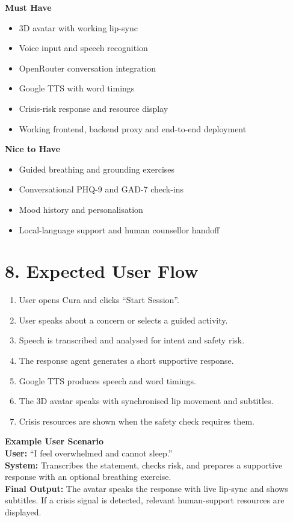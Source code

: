 \documentclass[9pt,a4paper]{article}
\begin{document}
\textbf{Must Have}
\begin{itemize}
  \item [ ] 3D avatar with working lip-sync
  \item [ ] Voice input and speech recognition
  \item [ ] OpenRouter conversation integration
  \item [ ] Google TTS with word timings
  \item [ ] Crisis-risk response and resource display
  \item [ ] Working frontend, backend proxy and end-to-end deployment
\end{itemize}

\textbf{Nice to Have}
\begin{itemize}
  \item [ ] Guided breathing and grounding exercises
  \item [ ] Conversational PHQ-9 and GAD-7 check-ins
  \item [ ] Mood history and personalisation
  \item [ ] Local-language support and human counsellor handoff
\end{itemize}

\section*{8. Expected User Flow}

\begin{enumerate}
  \item User opens Cura and clicks ``Start Session''.
  \item User speaks about a concern or selects a guided activity.
  \item Speech is transcribed and analysed for intent and safety risk.
  \item The response agent generates a short supportive response.
  \item Google TTS produces speech and word timings.
  \item The 3D avatar speaks with synchronised lip movement and subtitles.
  \item Crisis resources are shown when the safety check requires them.
\end{enumerate}

\textbf{Example User Scenario}\\
\textbf{User:} ``I feel overwhelmed and cannot sleep.''\\
\textbf{System:} Transcribes the statement, checks risk, and prepares a
supportive response with an optional breathing exercise.\\
\textbf{Final Output:} The avatar speaks the response with live lip-sync and
shows subtitles. If a crisis signal is detected, relevant human-support
resources are displayed.
\end{document}
